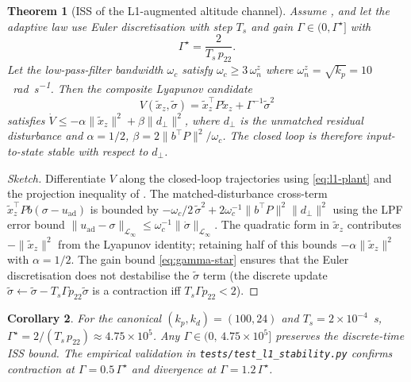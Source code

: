 \documentclass[11pt,a4paper]{article}
\theoremstyle{plain}
\newtheorem{theorem}{Theorem}
\newtheorem{corollary}[theorem]{Corollary}
\theoremstyle{definition}
\begin{document}
\begin{theorem}[ISS of the L1-augmented altitude channel]\label{thm:l1-iss}
Assume , and let the adaptive law use
Euler discretisation with step $T_s$ and gain
$\Gamma \in (0,\Gamma^\star]$ with
\begin{equation}
\Gamma^\star = \frac{2}{T_s\, p_{22}}. \label{eq:gamma-star}
\end{equation}
Let the low-pass-filter bandwidth $\omega_c$ satisfy
$\omega_c \ge 3\,\omega_n^z$ where
$\omega_n^z = \sqrt{k_p} = 10$~\si{\radian\per\second}.
Then the composite Lyapunov candidate
\begin{equation}
  V(\tilde x_z,\tilde\sigma) = \tilde x_z^\top P \tilde x_z
     + \Gamma^{-1}\tilde\sigma^2
\end{equation}
satisfies
$\dot V \le -\alpha\|\tilde x_z\|^2 + \beta\|d_\perp\|^2$,
where $d_\perp$ is the unmatched residual disturbance and
$\alpha=1/2$, $\beta = 2 \lVert b^\top P\rVert^2 / \omega_c$. The
closed loop is therefore input-to-state stable with respect to
$d_\perp$.
\end{theorem}

\begin{proof}[Sketch]
Differentiate $V$ along the closed-loop trajectories using
\eqref{eq:l1-plant} and the projection inequality of
. The matched-disturbance cross-term
$\tilde x_z^\top P b (\sigma-u_\mathrm{ad})$ is bounded by
$-\omega_c/2\,\tilde\sigma^2 + 2\omega_c^{-1}\|b^\top P\|^2\|d_\perp\|^2$
using the LPF error bound
$\lVert u_\mathrm{ad}-\sigma\rVert_{\mathcal L_\infty}
\le \omega_c^{-1}\lVert\dot\sigma\rVert_{\mathcal L_\infty}$.
The quadratic form in $\tilde x_z$ contributes $-\|\tilde x_z\|^2$
from the Lyapunov identity; retaining half of this bounds
$-\alpha\|\tilde x_z\|^2$ with $\alpha=1/2$. The gain bound
\eqref{eq:gamma-star} ensures that the Euler discretisation does
not destabilise the $\tilde\sigma$ term (the discrete update
$\tilde\sigma \gets \tilde\sigma - T_s\Gamma p_{22}\tilde\sigma$
is a contraction iff $T_s\Gamma p_{22}<2$).
\end{proof}

\begin{corollary}\label{cor:gamma-bound}
For the canonical $(k_p,k_d)=(100,24)$ and $T_s=2\times 10^{-4}$~s,
$\Gamma^\star = 2/(T_s\,p_{22}) \approx 4.75\times 10^5$. Any
$\Gamma\in(0,\,4.75\times 10^5]$ preserves the discrete-time ISS
bound. The empirical validation in \texttt{tests/test\_l1\_stability.py}
confirms contraction at $\Gamma=0.5\,\Gamma^\star$ and divergence at
$\Gamma=1.2\,\Gamma^\star$.
\end{corollary}
\end{document}
